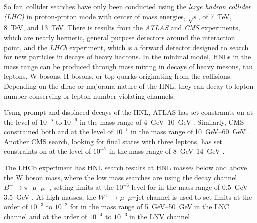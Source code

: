 So far, collider searches have only been conducted using the \textit{large hadron collider (LHC)} in proton-proton mode with center of mass energies, $\sqrt{s}$, of \SI{7}{\tera\electronvolt}, \SI{8}{\tera\electronvolt}, and \SI{13}{\tera\electronvolt}. There is results from the \textit{ATLAS} and \textit{CMS} experiments, which are nearly hermetic, general purpose detectors around the interaction point, and the \textit{LHCb} experiment, which is a forward detector designed to search for new particles in decays of heavy hadrons. In the minimal model, HNLs in the \si{\gev} mass range can be produced through mass mixing in decays of heavy mesons, tau leptons, W bosons, H bosons, or top quarks originating from the collisions. Depending on the dirac or majorana nature of the HNL, they can decay to lepton number conserving or lepton number violating channels.

Using prompt and displaced decays of the HNL, ATLAS has set constraints on  at the level of $10^{-5}$ to $10^{-6}$ in the mass range of \SIrange{4}{10}{\giga\electronvolt} . Similarly, CMS constrained both  and  at the level of $10^{-5}$ in the mass range of \SIrange{10}{60}{\giga\electronvolt} . Another CMS search, looking for final states with three leptons, has set constraints on  at the level of $10^{-7}$ in the mass range of \SIrange{8}{14}{\giga\electronvolt} .

The LHCb experiment has HNL search results at HNL masses below and above the W boson mass, where the low mass searches are using the decay channel $B^- \rightarrow \pi^+ \mu^- \mu^-$, setting limits at the $10^{-3}$ level for  in the mass range of \SIrange{0.5}{3.5}{\giga\electronvolt} . At high masses, the $W^+ \rightarrow \mu^- \mu^\pm$jet channel is used to set limits at the order of $10^{-3}$ to $10^{-2}$ for  in the mass range of \SIrange{5}{50}{\giga\electronvolt} in the LNC channel and at the order of $10^{-4}$ to $10^{-3}$ in the LNV channel .





